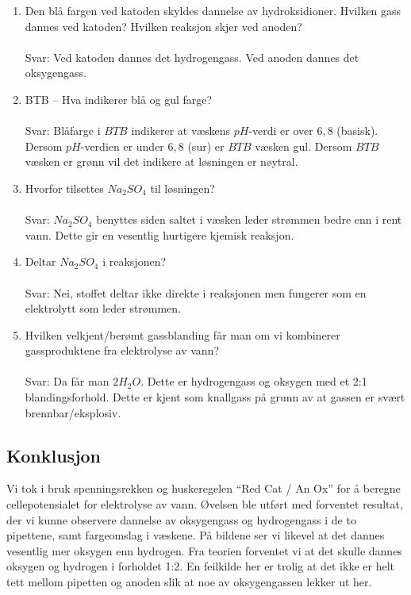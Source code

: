 \documentclass[norsk,11pt,a4paper]{report}
\begin{document}
\begin{enumerate}[itemsep=1cm]
\item Den blå fargen ved katoden skyldes dannelse av hydroksidioner. Hvilken gass dannes ved katoden? Hvilken reaksjon skjer ved anoden?\\\\
Svar: Ved katoden dannes det hydrogengass. Ved anoden dannes det oksygengass.

\item BTB – Hva indikerer blå og gul farge?\\\\
Svar: Blåfarge i $BTB$ indikerer at væskens $pH$-verdi er over $6,8$ (basisk). Dersom $pH$-verdien er under $6,8$ (sur) er $BTB$ væsken gul. Dersom $BTB$ væsken er grønn vil det indikere at løsningen er nøytral.

\item Hvorfor tilsettes $Na_2SO_4$ til løsningen?\\\\
Svar: $Na_2SO_4$ benyttes siden saltet i væsken leder strømmen bedre enn i rent vann. Dette gir en vesentlig hurtigere kjemisk reaksjon.

\item Deltar $Na_2SO_4$ i reaksjonen?\\\\
Svar: Nei, stoffet deltar ikke direkte i reaksjonen men fungerer som en elektrolytt som leder strømmen.

\item Hvilken velkjent/berømt gassblanding får man om vi kombinerer gassproduktene fra elektrolyse av vann?\\\\
Svar: Da får man $2H_2O$. Dette er hydrogengass og oksygen med et 2:1 blandingsforhold. Dette er kjent som knallgass på grunn av at gassen er svært brennbar/eksplosiv.

\end{enumerate}

\subsection*{Konklusjon}
Vi tok i bruk spenningsrekken og huskeregelen ``Red Cat / An Ox'' for å beregne cellepotensialet for elektrolyse av vann. Øvelsen ble utført med forventet resultat, der vi kunne observere dannelse av oksygengass og hydrogengass i de to pipettene, samt fargeomslag i væskene. På bildene ser vi likevel at det dannes vesentlig mer oksygen enn hydrogen. Fra teorien forventet vi at det skulle dannes oksygen og hydrogen i forholdet 1:2. En feilkilde her er trolig at det ikke er helt tett mellom pipetten og anoden slik at noe av oksygengassen lekker ut her. 

\end{document}
